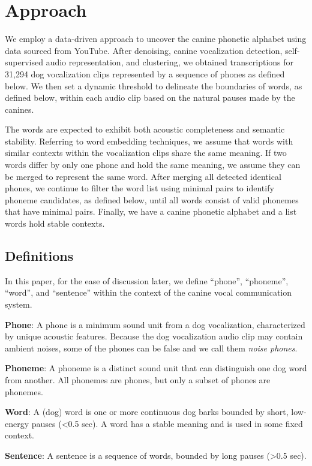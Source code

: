 \section{Approach}
\label{sec:approach}

We employ a data-driven approach to uncover the canine phonetic alphabet using data sourced from YouTube. After denoising, canine vocalization detection, self-supervised audio representation, and clustering, we obtained transcriptions for 31,294 dog vocalization clips represented by a sequence of phones as defined below. We then set a dynamic threshold to delineate the boundaries of words, as defined below, within each audio clip based on the natural pauses made by the canines. 

The words are expected to exhibit both acoustic completeness and semantic stability. Referring to word embedding techniques, we assume that words with similar contexts within the vocalization clips share the same meaning. If two words differ by only one phone and hold the same meaning, we assume they can be merged to represent the same word. After merging all detected identical phones, we continue to filter the word list using minimal pairs to identify phoneme candidates, as defined below, until all words consist of valid phonemes that have minimal pairs. Finally, we have a canine phonetic alphabet and a list words hold stable contexts.

\subsection{Definitions}
In this paper, for the ease of discussion later, we define ``phone'', ``phoneme'', ``word'', and ``sentence'' within the context of the canine vocal communication system.

\textbf{Phone}: A phone is a minimum sound unit from a dog vocalization, characterized by
unique acoustic features. Because the dog vocalization audio clip may contain ambient noises, some of the phones can be false and we call them \textit{noise phones}.

\textbf{Phoneme}: A phoneme is a distinct sound unit that can distinguish one dog word
from another. All phonemes are phones, but only a subset of phones are phonemes. 

\textbf{Word}: A (dog) word is one or more continuous dog barks bounded by short,
low-energy pauses (<0.5 sec). A word has a stable meaning and is used in some fixed
context. 

\textbf{Sentence}: A sentence is a sequence of words, bounded by long pauses (>0.5 sec). 

